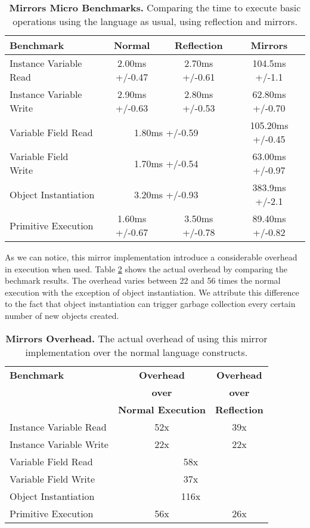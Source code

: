 \begin{table}[ht]
 	\centering
 	\begin{tabular}{lccc}%
			\toprule
			\textbf{Benchmark}
			& \textbf{Normal}
 			& \textbf{Reflection}
			& \textbf{Mirrors}\\
		\midrule
		Instance Variable Read & 2.00ms +/-0.47 & 2.70ms +/-0.61 & 104.5ms +/-1.1 \\\midrule
		Instance Variable Write & 2.90ms +/-0.63 & 2.80ms +/-0.53 & 62.80ms +/-0.70 \\\midrule
		Variable Field Read &  \multicolumn{2}{c}{1.80ms +/-0.59}  & 105.20ms +/-0.45 \\\midrule
		Variable Field Write & \multicolumn{2}{c}{1.70ms +/-0.54}  & 63.00ms +/-0.97 \\\midrule
		Object Instantiation &  \multicolumn{2}{c}{3.20ms +/-0.93}  & 383.9ms +/-2.1 \\\midrule
		Primitive Execution & 1.60ms +/-0.67 & 3.50ms +/-0.78 & 89.40ms +/-0.82 \\\midrule
 	\end{tabular}
	\vspace*{0.2cm}
 	\caption{\textbf{Mirrors Micro Benchmarks.} Comparing the time to execute basic operations using the language as usual, using reflection and \Vtt mirrors.\label{tb:benchmarks}}
 \end{table}

As we can notice, this mirror implementation introduce a considerable overhead in execution when used. Table \ref{tb:benchmarks_percentages} shows the actual overhead by comparing the bechmark results. The overhead varies between 22 and 56 times the normal execution with the exception of object instantiation. We attribute this difference to the fact that object instantiation can trigger garbage collection every certain number of new objects created.

\begin{table}[ht]
 	\centering
 	\begin{tabular}{lcc}
			\toprule
			\textbf{Benchmark}
			& \textbf{Overhead}
 			& \textbf{Overhead}\\
		&\textbf{over}&\textbf{over}\\
		&\textbf{Normal Execution}&\textbf{Reflection}\\
		\midrule
		Instance Variable Read & 52x & 39x \\\midrule
		Instance Variable Write & 22x & 22x \\\midrule
		Variable Field Read &  \multicolumn{2}{c}{58x} \\\midrule
		Variable Field Write & \multicolumn{2}{c}{37x} \\\midrule
		Object Instantiation &  \multicolumn{2}{c}{116x} \\\midrule
		Primitive Execution & 56x & 26x \\\midrule
 	\end{tabular}
	\vspace*{0.2cm}
 	\caption{\textbf{Mirrors Overhead.} The actual overhead of using this mirror implementation over the normal language constructs.\label{tb:benchmarks_percentages}}
 \end{table}


